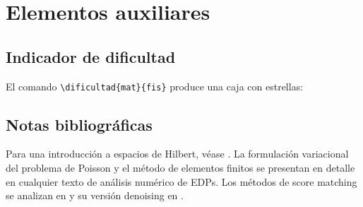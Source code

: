 \section{Elementos auxiliares}
\label{sec:auxiliares}

\subsection{Indicador de dificultad}

El comando \texttt{\textbackslash dificultad\{mat\}\{fis\}} produce una caja con estrellas:


\subsection{Notas bibliográficas}

\begin{notasbib}
Para una introducción a espacios de Hilbert, véase \cite{reed1980functional}.
La formulación variacional del problema de Poisson y el método de elementos
finitos se presentan en detalle en cualquier texto de análisis numérico de
EDPs. Los métodos de score matching se analizan en
\cite{hyvarinen2005estimation} y su versión denoising en
\cite{vincent2011connection}.
\end{notasbib}